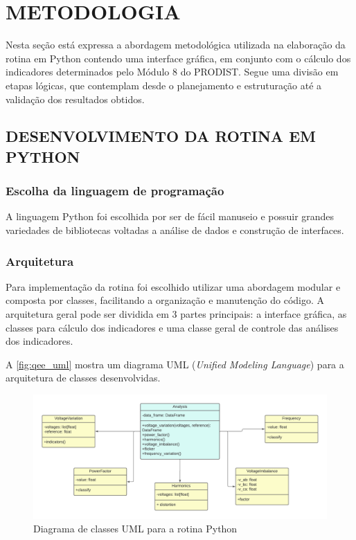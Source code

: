 \chapter{METODOLOGIA}

Nesta seção está expressa a abordagem metodológica utilizada na elaboração da rotina em Python contendo uma interface gráfica, em conjunto com o cálculo dos indicadores determinados pelo Módulo 8 do PRODIST. Segue uma divisão em etapas lógicas, que contemplam desde o planejamento e estruturação até a validação dos resultados obtidos.

\section{DESENVOLVIMENTO DA ROTINA EM PYTHON}

\subsection{Escolha da linguagem de programação}

A linguagem Python foi escolhida por ser de fácil manuseio e possuir grandes variedades de bibliotecas voltadas a análise de dados e construção de interfaces.

\subsection{Arquitetura}

Para implementação da rotina foi escolhido utilizar uma abordagem modular e composta por classes, facilitando a organização e manutenção do código. A arquitetura geral pode ser dividida em 3 partes principais: a interface gráfica, as classes para cálculo dos indicadores e uma classe geral de controle das análises dos indicadores.

A \autoref{fig:qee_uml} mostra um diagrama UML (\textit{Unified Modeling Language}) para a arquitetura de classes desenvolvidas.

\begin{figure}[H]
	\centering
	\caption{Diagrama de classes UML para a rotina Python}
	\label{fig:qee_uml}
	\includegraphics[width=16cm]{illustrations/figures/qee_uml.pdf}
\end{figure}

